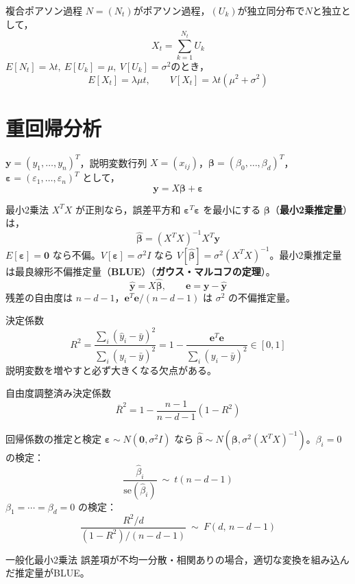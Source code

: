 \documentclass[a4paper,11pt]{ltjsarticle}
\begin{document}
\begin{term}{複合ポアソン過程}
$N=(N_t)$がポアソン過程，$(U_k)$が独立同分布で$N$と独立として，
\[
X_t = \sum_{k=1}^{N_t} U_k
\]
$E[N_t]=\lambda t,\ E[U_k]=\mu,\ V[U_k]=\sigma^2$のとき，
\[
E[X_t]=\lambda\mu t,\qquad V[X_t]=\lambda t(\mu^2+\sigma^2)
\]
\end{term}

\section{重回帰分析}

$\bm y=(y_1,\dots,y_n)^T$，説明変数行列 $X=(x_{ij})$，$\bm\beta=(\beta_0,\dots,\beta_d)^T$，$\bm\varepsilon=(\varepsilon_1,\dots,\varepsilon_n)^T$ として，
\[
\bm y = X\bm\beta + \bm\varepsilon
\]

\begin{term}{最小2乗法}
$X^TX$ が正則なら，誤差平方和 $\bm\varepsilon^T\bm\varepsilon$ を最小にする $\bm\beta$（\textbf{最小2乗推定量}）は，
\[
\hat{\bm\beta} = (X^TX)^{-1}X^T\bm y
\]
$E[\bm\varepsilon]=\bm 0$ なら不偏。$V[\bm\varepsilon]=\sigma^2 I$ なら $V[\hat{\bm\beta}]=\sigma^2(X^TX)^{-1}$。最小2乗推定量は最良線形不偏推定量（\textbf{BLUE}）（\textbf{ガウス・マルコフの定理}）。
\[
\hat{\bm y} = X\hat{\bm\beta},\qquad \bm e = \bm y - \hat{\bm y}
\]
残差の自由度は $n-d-1$，$\bm e^T\bm e/(n-d-1)$ は $\sigma^2$ の不偏推定量。
\end{term}

\begin{term}{決定係数}
\[
R^2 = \frac{\sum_i (\hat y_i-\bar y)^2}{\sum_i (y_i-\bar y)^2} = 1-\frac{\bm e^T\bm e}{\sum_i(y_i-\bar y)^2} \in [0,1]
\]
説明変数を増やすと必ず大きくなる欠点がある。
\end{term}

\begin{term}{自由度調整済み決定係数}
\[
\bar R^2 = 1-\frac{n-1}{n-d-1}(1-R^2)
\]
\end{term}

\begin{term}{回帰係数の推定と検定}
$\bm\varepsilon\sim N(\bm 0,\sigma^2 I)$ なら $\hat{\bm\beta}\sim N(\bm\beta,\sigma^2(X^TX)^{-1})$。$\beta_i=0$ の検定：
\[
\frac{\hat\beta_i}{\mathrm{se}(\hat\beta_i)} \ \sim\ t(n-d-1)
\]
$\beta_1=\cdots=\beta_d=0$ の検定：
\[
\frac{R^2/d}{(1-R^2)/(n-d-1)} \ \sim\ F(d,\,n-d-1)
\]
\end{term}

\begin{term}{一般化最小2乗法}
誤差項が不均一分散・相関ありの場合，適切な変換を組み込んだ推定量がBLUE。
\end{term}
\end{document}
